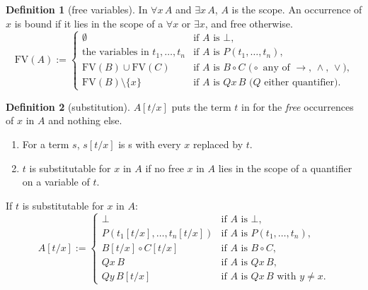 \documentclass[a4paper, 11pt]{article}
\theoremstyle{definition}
\newtheorem{definition}{Definition}[section]
\begin{document}
\begin{definition}[free variables]
    In $\forall x \, A$ and $\exists x \, A$, $A$ is the scope. An occurrence of $x$ is bound if it lies in the scope of
    a $\forall x$ or $\exists x$, and free otherwise.
    \[
        \mathrm{FV}(A) := 
        \begin{cases}
            \emptyset & \text{if $A$ is $\bot$,} \\
            \text{the variables in } t_1, \dots, t_n & \text{if $A$ is $P(t_1, \dots, t_n)$,} \\
            \mathrm{FV}(B) \cup \mathrm{FV}(C) & \text{if $A$ is $B \circ C$ ($\circ$ any of $\to$, $\land$, $\lor$),} \\
            \mathrm{FV}(B) \setminus \{x\} & \text{if $A$ is $Qx\, B$ ($Q$ either quantifier).}
        \end{cases}
    \]
\end{definition}

\begin{definition}[substitution]
    $A[t/x]$ puts the term $t$ in for the \textit{free} occurrences of $x$ in $A$ and nothing else.
    \begin{enumerate}
        \item For a term $s$, $s[t/x]$ is s with every $x$ replaced by $t$.
        \item $t$ is substitutable for $x$ in $A$ if no free $x$ in $A$ lies in the scope of a quantifier on a variable
        of $t$.
    \end{enumerate}
    If $t$ is substitutable for $x$ in $A$:
    \[
    A[t/x] :=
    \begin{cases}
        \bot & \text{if } A \text{ is } \bot, \\
        P(t_1[t/x], \dots, t_n[t/x]) & \text{if } A \text{ is } P(t_1, \dots, t_n), \\
        B[t/x] \circ C[t/x] & \text{if } A \text{ is } B \circ C, \\
        Qx \, B & \text{if } A \text{ is } Qx \, B, \\ 
        Qy \, B[t/x] & \text{if } A \text{ is } Qx \, B \text{ with } y \neq x.
    \end{cases} 
    \]
\end{definition}
\end{document}
